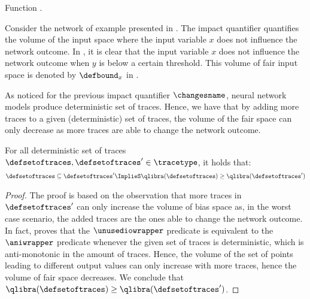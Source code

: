 \begin{marginfigure}
    \caption{Function \qlibraname.}
  \end{marginfigure}

\begin{example}
Consider the network of example presented in .
The \qlibraname{} impact quantifier quantifies the volume of the input space where the input variable $x$ does not influence the network outcome.
In , it is clear that the input variable $x$ does not influence the network outcome when $y$ is below a certain threshold. This volume of fair input space is denoted by $\defbound_x$ in .
\end{example}

As noticed for the previous impact quantifier $\changesname$, neural network models produce deterministic set of traces.
Hence, we have that by adding more traces to a given (deterministic) set of traces, the volume of the fair space can only decrease as more traces are able to change the network outcome.

\begin{lemma}
For all deterministic set of traces $\defsetoftraces, \defsetoftraces'\in\tracetype$, it holds that:
  \begin{align*}
    \defsetoftraces \subseteq \defsetoftraces' \ImplieS \qlibra(\defsetoftraces) \ge \qlibra(\defsetoftraces')
  \end{align*}
\end{lemma}
\begin{proof}
  The proof is based on the observation that more traces in $\defsetoftraces'$ can only increase the volume of bias space as, in the worst case scenario, the added traces are the ones able to change the network outcome.
  In fact,  proves that the $\unusediowrapper$ predicate is equivalent to the $\aniwrapper$ predicate whenever the given set of traces is deterministic, which is anti-monotonic in the amount of traces.
  Hence, the volume of the set of points leading to different output values can only increase with more traces, hence the volume of fair space decreases.
  We conclude that $\qlibra(\defsetoftraces) \ge \qlibra(\defsetoftraces')$.
\end{proof}

